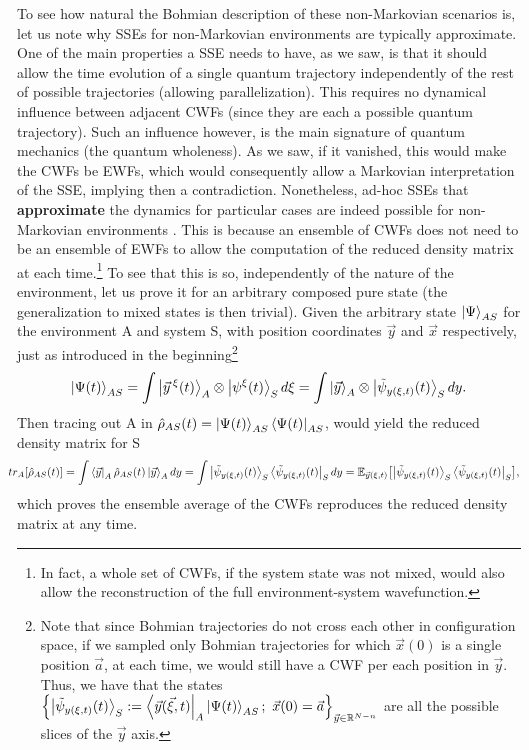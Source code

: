 \documentclass[11pt, a4paper]{article} %
\newcommand{\R}{\mathbb{R}} %
\begin{document}
To see how natural the Bohmian description of these non-Markovian scenarios is, let us note why SSEs for non-Markovian environments are typically approximate. One of the main properties a SSE needs to have, as we saw, is that it should allow the time evolution of a single quantum trajectory independently of the rest of possible trajectories (allowing parallelization). This requires no dynamical influence between adjacent CWFs (since they are each a possible quantum trajectory). Such an influence however, is the main signature of quantum mechanics (the quantum wholeness). As we saw, if it vanished, this would make the CWFs be EWFs, which would consequently allow a Markovian interpretation of the SSE, implying then a contradiction. Nonetheless, ad-hoc SSEs that {\bf approximate} the dynamics for particular cases are indeed possible for non-Markovian environments \cite{ Diosi, WisemanSSE, Thz}. This is because an ensemble of CWFs does not need to be an ensemble of EWFs to allow the computation of the reduced density matrix at each time.\footnote{In fact, a whole set of CWFs, if the system state was not mixed, would also allow the reconstruction of the full environment-system wavefunction. } To see that this is so, independently of the nature of the environment, let us prove it for an arbitrary composed pure state (the generalization to mixed states is then trivial). Given the arbitrary state $\ket{\Psi}_{AS}$ for the environment A and system S, with position coordinates $\vec{y}$ and $\vec{x}$ respectively, just as introduced in the beginning\footnote{Note that since Bohmian trajectories do not cross each other in configuration space, if we sampled only Bohmian trajectories for which $\vec{x}(0)$ is a single position $\vec{a}$, at each time, we would still have a CWF per each position in $\vec{y}$. Thus, we have that the states $\qty{\ket{\tilde{\psi}_{y(\xi,t)}(t)}_S:=\bra{\vec{y}(\vec{\xi},t)}_A\ket{\Psi(t)}_{AS};\ \vec{x}(0)=\vec{a}}_{\vec{y}\in\R^{N-n}}$ are all the possible slices of the $\vec{y}$ axis.}\vspace{-0.2cm}
\begin{equation}
\ket{\Psi(t)}_{AS}=\int\ket{\vec{y}^{\:\xi}(t)}_A\otimes \ket{\psi^\xi(t)}_S d\xi = \int\ket{\vec{y}}_A\otimes \ket{\tilde{\psi}_{y(\xi,t)}(t)}_S dy.
\end{equation}
Then tracing out A in $\hat{\rho}_{AS}(t)=\ket{\Psi(t)}_{AS}\bra{\Psi(t)}_{AS}$, would yield the reduced density matrix for S
\begin{equation}\hspace{-0.3cm}
tr_A\qty[\hat{\rho}_{AS}(t)] = \int\bra{\vec{y}}_A\hat{\rho}_{AS}(t)\ket{\vec{y}}_Ady = \int \ket{\tilde{\psi}_{y(\xi,t)}(t)}_S\bra{\tilde{\psi}_{y(\xi,t)}(t)}_S dy = \mathbb{E}_{\vec{y}(\xi,t)}\qty[\ket{\tilde{\psi}_{y(\xi,t)}(t)}_S\bra{\tilde{\psi}_{y(\xi,t)}(t)}_S],
\end{equation}
which proves the ensemble average of the CWFs reproduces the reduced density matrix at any time.\vspace{-0.15cm}
\end{document}
